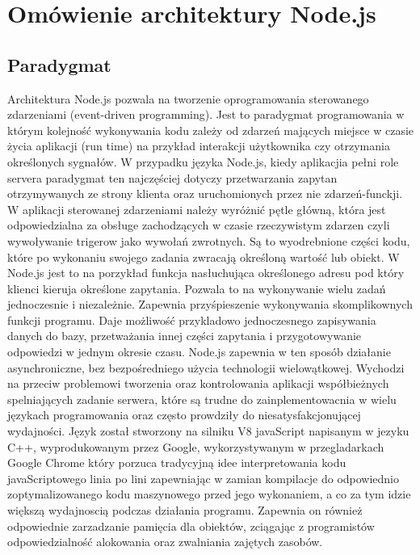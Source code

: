 \documentclass[12pt]{report}
\begin{document}
\chapter{Omówienie architektury Node.js} \label{rozdz.2}

\section{Paradygmat}
Architektura Node.js pozwala na tworzenie oprogramowania sterowanego zdarzeniami (event-driven programming). 
Jest to paradygmat programowania w którym kolejność wykonywania kodu zależy od zdarzeń mających miejsce w czasie życia aplikacji (run time) na przykład interakcji użytkownika czy otrzymania określonych sygnałów. 
W przypadku języka Node.js, kiedy aplikacjia pełni role servera paradygmat ten najczęściej dotyczy przetwarzania zapytan otrzymywanych ze strony klienta oraz uruchomionych przez nie zdarzeń-funckji. 
W aplikacji sterowanej zdarzeniami należy wyróżnić pętle główną, która jest odpowiedzialna za obsługe zachodzących w czasie rzeczywistym zdarzen czyli wywoływanie trigerow jako wywołań zwrotnych. 
Są to wyodrebnione części kodu, które po wykonaniu swojego zadania zwracają określoną wartość lub obiekt. 
W Node.js jest to na porzykład funkcja nasłuchująca określonego adresu pod który klienci kieruja określone zapytania. 
Pozwala to na wykonywanie wielu zadań jednoczesnie i niezależnie. 
Zapewnia przyśpieszenie wykonywania skomplikownych funkcji programu. 
Daje możliwość przykladowo jednoczesnego zapisywania danych do bazy, przetważania innej części zapytania i przygotowywanie odpowiedzi w jednym okresie czasu. 
Node.js zapewnia w ten sposób działanie asynchroniczne, bez bezpośredniego użycia technologii wielowątkowej. 
Wychodzi na przeciw problemowi tworzenia oraz kontrolowania aplikacji współbieżnych spelniających zadanie serwera, które są trudne do zainplementowacnia w wielu językach programowania oraz często prowdziły do niesatysfakcjonującej wydajności. 
Język został stworzony na silniku V8 javaScript napisanym w jezyku C++, wyprodukowanym przez Google, wykorzystywanym w przegladarkach Google Chrome który porzuca tradycyjną idee interpretowania kodu javaScriptowego linia po lini zapewniając w zamian kompilacje do odpowiednio zoptymalizowanego kodu maszynowego przed jego wykonaniem, a co za tym idzie większą wydajnoscią podczas działania programu. 
Zapewnia on również odpowiednie zarzadzanie pamięcia dla obiektów, zciągając z programistów odpowiedzialność alokowania oraz zwalniania zajętych zasobów.
\end{document}
